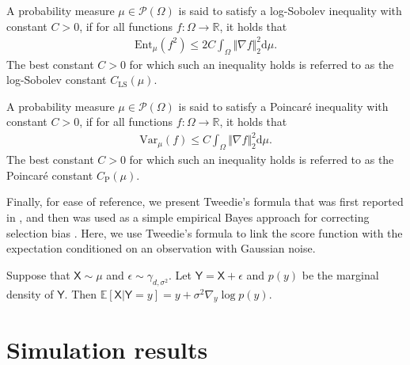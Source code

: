 \documentclass[twoside,11pt]{article}
\def\sR{{\mathbb{R}}}
\newcommand{\E}{\mathbb{E}}
\newcommand{\diff}{\mathrm{d}}
\numberwithin{equation}{section}
\begin{document}
\begin{definition}  \label{def:lsi}
    A probability measure $\mu \in \mathcal{P}(\Omega)$ is said to satisfy a log-Sobolev inequality with constant $C > 0$, if for all functions $f: \Omega \to \sR$, it holds that
    \begin{align*}
        \mathrm{Ent}_{\mu}(f^2) \le 2 C \int_{\Omega} \Vert \nabla f \Vert_2^2 \diff \mu.
    \end{align*}
    The best constant $C > 0$ for which such an inequality holds is referred to as the log-Sobolev constant $C_{\mathrm{LS}}(\mu)$.
\end{definition}


\begin{definition}  \label{def:pi}
    A probability measure $\mu \in \mathcal{P}(\Omega)$ is said to satisfy a Poincar{\'e} inequality with constant $C > 0$, if for all functions $f: \Omega \to \sR$, it holds that
    \begin{align*}
        \mathrm{Var}_{\mu}(f) \le C \int_{\Omega} \Vert \nabla f \Vert_2^2 \diff \mu.
    \end{align*}
    The best constant $C > 0$ for which such an inequality holds is referred to as the Poincar{\'e} constant $C_{\mathrm{P}}(\mu)$.
\end{definition}

Finally, for ease of reference, we present Tweedie's formula that was first reported in \citet{robbins1956empirical}, and then was used as a simple empirical Bayes approach for correcting selection bias \citep{efron2011tweedie}. Here, we use Tweedie's formula to link the score function with the expectation conditioned on an observation with Gaussian noise.

\begin{lemma} 
\label{lm:tw-formula}
Suppose that $\mathsf{X} \sim \mu$ and $\epsilon \sim \gamma_{d, \sigma^2}$.
Let $\mathsf{Y} = \mathsf{X} + \epsilon$ and $p(y)$ be the marginal density of $\mathsf{Y}$.
Then $\E[\mathsf{X} | \mathsf{Y} = y] = y + \sigma^2 \nabla_y \log p(y)$.
\end{lemma}

\iffalse
\section{Simulation results}
\end{document}

